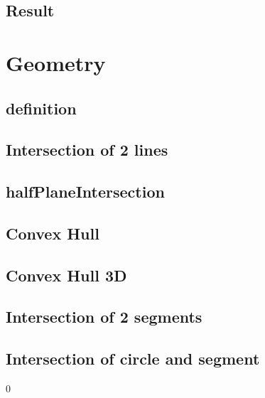 \documentclass[a4paper,10pt,twocolumn,oneside]{article}
\begin{document}
\subsection{Result}


\section{Geometry}

% 

\subsection{definition}


\subsection{Intersection of 2 lines}


% 
\subsection{halfPlaneIntersection}


\subsection{Convex Hull}


\subsection{Convex Hull 3D}


\subsection{Intersection of 2 segments}


\subsection{Intersection of circle and segment}0

\end{document}
